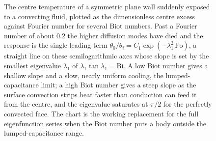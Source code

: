 \begin{figure}[htbp]
\centering
{}
\caption[One-term transient chart for the plane wall]{The centre
temperature of a symmetric plane wall suddenly exposed to a convecting
fluid, plotted as the dimensionless centre excess against Fourier number
for several Biot numbers. Past a Fourier number of about $0.2$ the higher
diffusion modes have died and the response is the single leading term
$\theta_0/\theta_i = C_1 \exp(-\lambda_1^2\,\text{Fo})$, a straight line on
these semilogarithmic axes whose slope is set by the smallest eigenvalue
$\lambda_1$ of $\lambda_1 \tan\lambda_1 = \text{Bi}$. A low Biot number
gives a shallow slope and a slow, nearly uniform cooling, the
lumped-capacitance limit; a high Biot number gives a steep slope as the
surface convection strips heat faster than conduction can feed it from the
centre, and the eigenvalue saturates at $\pi/2$ for the perfectly
convected face. The chart is the working replacement for the full
eigenfunction series when the Biot number puts a body outside the
lumped-capacitance range.}
\label{fig:vol04ch05:heisler-oneterm}
\end{figure}
